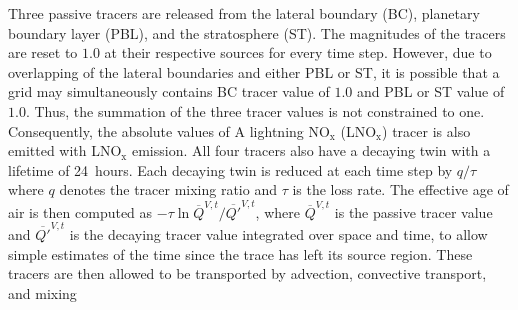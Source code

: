 Three passive tracers are released from the lateral boundary (BC), planetary boundary layer (PBL), and
the stratosphere (ST). The magnitudes of the tracers are reset to $1.0$ at their respective sources for every
time step. However, due to overlapping of the lateral boundaries and either PBL or ST, it is possible that
a grid may simultaneously contains BC tracer value of $1.0$ and PBL or ST value of $1.0$. Thus, the
summation of the three tracer values is not constrained to one. Consequently, the absolute values of
A lightning NO$_\mathrm{x}$ (LNO$_\mathrm{x}$) tracer is also emitted with
LNO$_\mathrm{x}$ emission. All four tracers also have a decaying twin with a lifetime of 24~hours.
Each decaying twin is reduced at each time step by $q/\tau$ where $q$ denotes the tracer mixing ratio
and $\tau$ is the loss rate. The effective age of air is then computed as $-\tau\ln\overline{Q}^{V,t}/\overline{Q'}^{V,t}$,
where $\overline{Q}^{V,t}$ is the passive tracer value and $\overline{Q'}^{V,t}$ is the decaying tracer value
integrated over space and time, to allow simple estimates of the time since the trace has left its source region.
These tracers are then allowed to be transported by advection, convective transport, and mixing 


